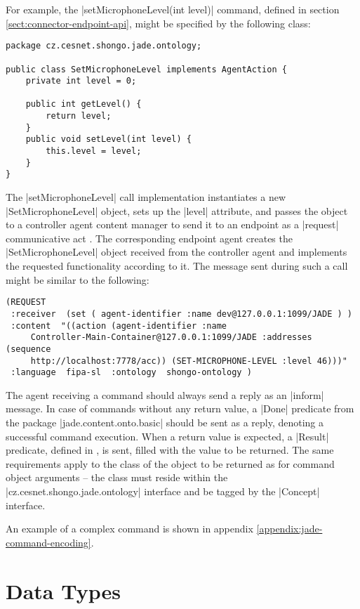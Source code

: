 For example, the |setMicrophoneLevel(int level)| command, defined in section \ref{sect:connector-endpoint-api}, might be specified by the following class:
\begin{verbatim}
package cz.cesnet.shongo.jade.ontology;

public class SetMicrophoneLevel implements AgentAction {
    private int level = 0;

    public int getLevel() {
        return level;
    }
    public void setLevel(int level) {
        this.level = level;
    }
}
\end{verbatim}
The |setMicrophoneLevel| call implementation instantiates a new |SetMicrophoneLevel| object, sets up the |level| attribute, and passes the object to a controller agent content manager to send it to an endpoint as a |request| communicative act \cite{FIPA-ComActSpec}. The corresponding endpoint agent creates the |SetMicrophoneLevel| object received from the controller agent and implements the requested functionality according to it. The message sent during such a call might be similar to the following:
\begin{verbatim}
(REQUEST
 :receiver  (set ( agent-identifier :name dev@127.0.0.1:1099/JADE ) )
 :content  "((action (agent-identifier :name
     Controller-Main-Container@127.0.0.1:1099/JADE :addresses (sequence
     http://localhost:7778/acc)) (SET-MICROPHONE-LEVEL :level 46)))"
 :language  fipa-sl  :ontology  shongo-ontology )
\end{verbatim}

The agent receiving a command should always send a reply as an |inform| \cite{FIPA-ComActSpec} message. In case of commands without any return value, a |Done| predicate from the package |jade.content.onto.basic| should be sent as a reply, denoting a successful command execution. When a return value is expected, a |Result| predicate, defined in \cite{FIPA-SL}, is sent, filled with the value to be returned. The same requirements apply to the class of the object to be returned as for command object arguments -- the class must reside within the |cz.cesnet.shongo.jade.ontology| interface and be tagged by the |Concept| interface.

An example of a complex command is shown in appendix \ref{appendix:jade-command-encoding}.




\section{Data Types}

